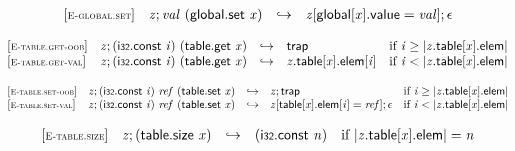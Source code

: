 $$
\begin{array}{@{}l@{}lcl@{}l@{}}
{[\textsc{\scriptsize E{-}global.set}]} \quad & {\mathit{z}} ; {\mathit{val}}~(\mathsf{global.set}~{\mathit{x}}) &\hookrightarrow& {\mathit{z}}[\mathsf{global}[{\mathit{x}}].\mathsf{value} = {\mathit{val}}] ; \epsilon &  \\
\end{array}
$$

\vspace{1ex}

$$
\begin{array}{@{}l@{}lcl@{}l@{}}
{[\textsc{\scriptsize E{-}table.get{-}oob}]} \quad & {\mathit{z}} ; (\mathsf{i{\scriptstyle32}}.\mathsf{const}~{\mathit{i}})~(\mathsf{table.get}~{\mathit{x}}) &\hookrightarrow& \mathsf{trap} &\quad
  \mbox{if}~{\mathit{i}} \geq {|{{\mathit{z}}.\mathsf{table}}{[{\mathit{x}}]}.\mathsf{elem}|} \\
{[\textsc{\scriptsize E{-}table.get{-}val}]} \quad & {\mathit{z}} ; (\mathsf{i{\scriptstyle32}}.\mathsf{const}~{\mathit{i}})~(\mathsf{table.get}~{\mathit{x}}) &\hookrightarrow& {{\mathit{z}}.\mathsf{table}}{[{\mathit{x}}]}.\mathsf{elem}[{\mathit{i}}] &\quad
  \mbox{if}~{\mathit{i}} < {|{{\mathit{z}}.\mathsf{table}}{[{\mathit{x}}]}.\mathsf{elem}|} \\
\end{array}
$$

$$
\begin{array}{@{}l@{}lcl@{}l@{}}
{[\textsc{\scriptsize E{-}table.set{-}oob}]} \quad & {\mathit{z}} ; (\mathsf{i{\scriptstyle32}}.\mathsf{const}~{\mathit{i}})~{\mathit{ref}}~(\mathsf{table.set}~{\mathit{x}}) &\hookrightarrow& {\mathit{z}} ; \mathsf{trap} &\quad
  \mbox{if}~{\mathit{i}} \geq {|{{\mathit{z}}.\mathsf{table}}{[{\mathit{x}}]}.\mathsf{elem}|} \\
{[\textsc{\scriptsize E{-}table.set{-}val}]} \quad & {\mathit{z}} ; (\mathsf{i{\scriptstyle32}}.\mathsf{const}~{\mathit{i}})~{\mathit{ref}}~(\mathsf{table.set}~{\mathit{x}}) &\hookrightarrow& {\mathit{z}}[\mathsf{table}[{\mathit{x}}].\mathsf{elem}[{\mathit{i}}] = {\mathit{ref}}] ; \epsilon &\quad
  \mbox{if}~{\mathit{i}} < {|{{\mathit{z}}.\mathsf{table}}{[{\mathit{x}}]}.\mathsf{elem}|} \\
\end{array}
$$

\vspace{1ex}

$$
\begin{array}{@{}l@{}lcl@{}l@{}}
{[\textsc{\scriptsize E{-}table.size}]} \quad & {\mathit{z}} ; (\mathsf{table.size}~{\mathit{x}}) &\hookrightarrow& (\mathsf{i{\scriptstyle32}}.\mathsf{const}~{\mathit{n}}) &\quad
  \mbox{if}~{|{{\mathit{z}}.\mathsf{table}}{[{\mathit{x}}]}.\mathsf{elem}|} = {\mathit{n}} \\
\end{array}
$$

